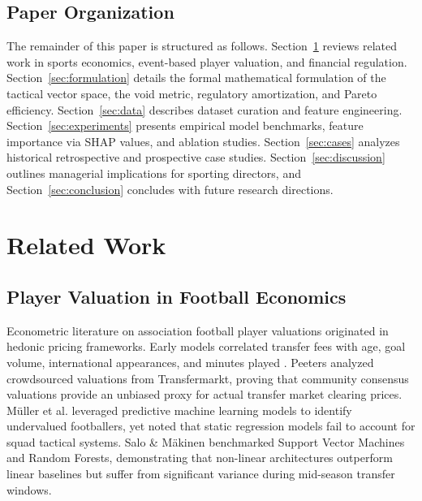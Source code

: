 \documentclass[10pt,journal,compsoc]{IEEEtran}
\begin{document}
\subsection{Paper Organization}
The remainder of this paper is structured as follows. Section~\ref{sec:related} reviews related work in sports economics, event-based player valuation, and financial regulation. Section~\ref{sec:formulation} details the formal mathematical formulation of the tactical vector space, the void metric, regulatory amortization, and Pareto efficiency. Section~\ref{sec:data} describes dataset curation and feature engineering. Section~\ref{sec:experiments} presents empirical model benchmarks, feature importance via SHAP values, and ablation studies. Section~\ref{sec:cases} analyzes historical retrospective and prospective case studies. Section~\ref{sec:discussion} outlines managerial implications for sporting directors, and Section~\ref{sec:conclusion} concludes with future research directions.

\section{Related Work}
\label{sec:related}

\subsection{Player Valuation in Football Economics}
Econometric literature on association football player valuations originated in hedonic pricing frameworks. Early models correlated transfer fees with age, goal volume, international appearances, and minutes played \cite{coates2016does, peeters2018testing}. Peeters \cite{peeters2018testing} analyzed crowdsourced valuations from Transfermarkt, proving that community consensus valuations provide an unbiased proxy for actual transfer market clearing prices. M{\"u}ller et al. \cite{muller2017beyond} leveraged predictive machine learning models to identify undervalued footballers, yet noted that static regression models fail to account for squad tactical systems. Salo \& M{\"a}kinen \cite{salo2020machine} benchmarked Support Vector Machines and Random Forests, demonstrating that non-linear architectures outperform linear baselines but suffer from significant variance during mid-season transfer windows.
\end{document}

